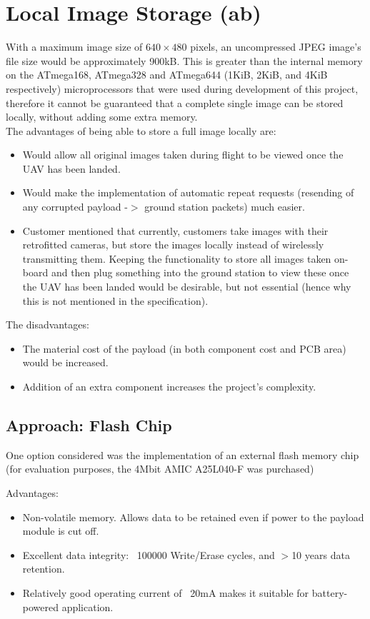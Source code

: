 
\section{Local Image Storage (ab)}
\label{sec:local_storage}

With a maximum image size of $640\times480$ pixels, an uncompressed JPEG 
image's file size would be approximately 900kB.
This is greater than the internal memory on the ATmega168, ATmega328 and 
ATmega644 (1KiB, 2KiB, and 4KiB respectively) microprocessors that were used 
during development of this project, therefore it cannot be guaranteed that a 
complete single image can be stored locally, without adding some extra memory.
\\
The advantages of being able to store a full image locally are:
\begin{itemize}
\item Would allow all original images taken during flight to be viewed once 
the UAV has been landed.
\item Would make the implementation of automatic repeat requests (resending of 
any corrupted payload -$>$ ground station packets) much easier.
\item Customer mentioned that currently, customers take images with their 
retrofitted cameras, but store the images locally instead of wirelessly 
transmitting them. Keeping the functionality to store all images taken 
on-board and then plug something into the ground station to view these once 
the UAV has been landed would be desirable, but not essential (hence why this 
is not mentioned in the specification).
\end{itemize}

The disadvantages:
\begin{itemize}
\item The material cost of the payload (in both component cost and PCB area) 
would be increased.
\item Addition of an extra component increases the project's complexity.
\end{itemize}

\subsection{Approach: Flash Chip}

One option considered was the implementation of an external flash memory chip 
(for evaluation purposes, the 4Mbit AMIC A25L040-F was purchased)

Advantages:
\begin{itemize}
\item Non-volatile memory. Allows data to be retained even if power to the payload module is cut off.
\item Excellent data integrity: ~100000 Write/Erase cycles, and $>$10 years data retention.
\item Relatively good operating current of ~20mA makes it suitable for battery-powered application.
\end{itemize}

